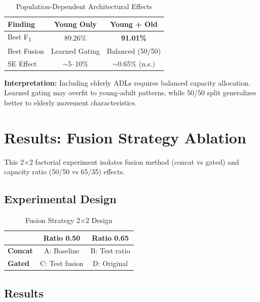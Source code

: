 \documentclass[journal,12pt]{IEEEtran}
\newcommand{\best}[1]{\textbf{\textcolor{bestresult}{#1}}}
\newcommand{\fone}{F\textsubscript{1}}
\begin{document}
\begin{table}[htbp]
\centering
\caption{Population-Dependent Architectural Effects}
\label{tab:pop_findings}
\begin{tabular}{@{}lcc@{}}
\toprule
\textbf{Finding} & \textbf{Young Only} & \textbf{Young + Old} \\
\midrule
Best \fone{} & 89.26\% & \best{91.01\%} \\
Best Fusion & Learned Gating & Balanced (50/50) \\
SE Effect & $\sim$5--10\% & $\sim$0.65\% (n.s.) \\
\bottomrule
\end{tabular}
\end{table}

\textbf{Interpretation:} Including elderly ADLs requires balanced capacity allocation. Learned gating may overfit to young-adult patterns, while 50/50 split generalizes better to elderly movement characteristics.


\section{Results: Fusion Strategy Ablation}
\label{sec:fusion_ablation}

This 2$\times$2 factorial experiment isolates fusion method (concat vs gated) and capacity ratio (50/50 vs 65/35) effects.

\subsection{Experimental Design}

\begin{table}[htbp]
\centering
\caption{Fusion Strategy 2$\times$2 Design}
\label{tab:fusion_design}
\begin{tabular}{@{}lcc@{}}
\toprule
& \textbf{Ratio 0.50} & \textbf{Ratio 0.65} \\
\midrule
\textbf{Concat} & A: Baseline & B: Test ratio \\
\textbf{Gated} & C: Test fusion & D: Original \\
\bottomrule
\end{tabular}
\end{table}

\subsection{Results}
\end{document}

